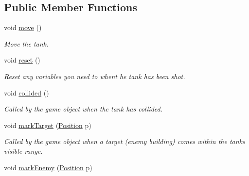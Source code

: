 \subsection*{Public Member Functions}
\begin{DoxyCompactItemize}
\item 
\mbox{\label{class_dumb_tank_af30f9ce47648428aa6589cb6e6a0490a}} 
void \mbox{\hyperlink{class_dumb_tank_af30f9ce47648428aa6589cb6e6a0490a}{move}} ()
\begin{DoxyCompactList}\small\item\em Move the tank. \end{DoxyCompactList}\item 
\mbox{\label{class_dumb_tank_a6d66330ab08b6730a12186ac71d794a0}} 
void \mbox{\hyperlink{class_dumb_tank_a6d66330ab08b6730a12186ac71d794a0}{reset}} ()
\begin{DoxyCompactList}\small\item\em Reset any variables you need to whent he tank has been shot. \end{DoxyCompactList}\item 
\mbox{\label{class_dumb_tank_a2340b3de8f33e3019ab483d56243de5a}} 
void \mbox{\hyperlink{class_dumb_tank_a2340b3de8f33e3019ab483d56243de5a}{collided}} ()
\begin{DoxyCompactList}\small\item\em Called by the game object when the tank has collided. \end{DoxyCompactList}\item 
\mbox{\label{class_dumb_tank_a06dd83683ff628421d6841a8ad8f1877}} 
void \mbox{\hyperlink{class_dumb_tank_a06dd83683ff628421d6841a8ad8f1877}{mark\+Target}} (\mbox{\hyperlink{class_position}{Position}} p)
\begin{DoxyCompactList}\small\item\em Called by the game object when a target (enemy building) comes within the tanks visible range. \end{DoxyCompactList}\item 
\mbox{\label{class_dumb_tank_a6e285a834c2f65bc559c0f08133acc3e}} 
void \mbox{\hyperlink{class_dumb_tank_a6e285a834c2f65bc559c0f08133acc3e}{mark\+Enemy}} (\mbox{\hyperlink{class_position}{Position}} p)

\end{DoxyCompactItemize}
